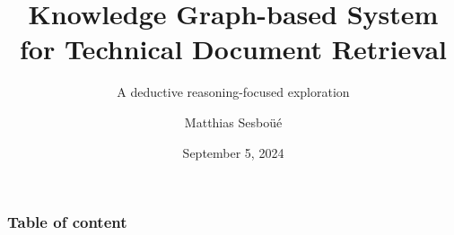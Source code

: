 

\title{Knowledge Graph-based System for Technical Document Retrieval}
\subtitle{A deductive reasoning-focused exploration}
\author{Matthias Sesboüé}
\date{September 5, 2024}


    \frame{\titlepage}
    
    \section[Table of content]{}
    \frame
    {
    \frametitle{Table of content}
    \tableofcontents
    }
    
    

    

    

    
    
    

    


